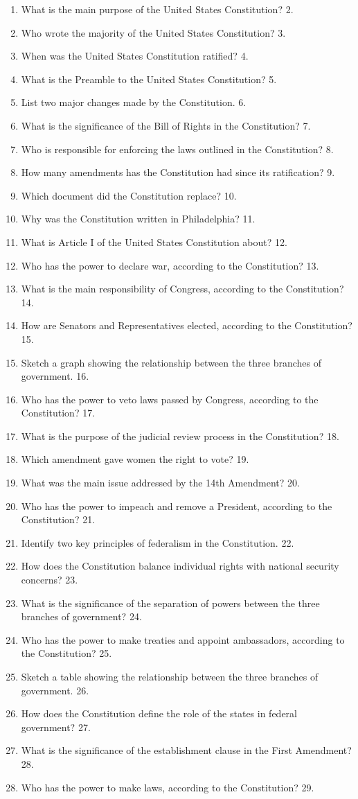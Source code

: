 \documentclass{article}
\begin{document}
\begin{enumerate}
\item What is the main purpose of the United States Constitution? 2. \item Who wrote the majority of the United States Constitution? 3. \item When was the United States Constitution ratified? 4. \item What is the Preamble to the United States Constitution? 5. \item List two major changes made by the Constitution. 6. \item What is the significance of the Bill of Rights in the Constitution? 7. \item Who is responsible for enforcing the laws outlined in the Constitution? 8. \item How many amendments has the Constitution had since its ratification? 9. \item Which document did the Constitution replace? 10. \item Why was the Constitution written in Philadelphia? 11. \item What is Article I of the United States Constitution about? 12. \item Who has the power to declare war, according to the Constitution? 13. \item What is the main responsibility of Congress, according to the Constitution? 14. \item How are Senators and Representatives elected, according to the Constitution? 15. \item Sketch a graph showing the relationship between the three branches of government. 16. \item Who has the power to veto laws passed by Congress, according to the Constitution? 17. \item What is the purpose of the judicial review process in the Constitution? 18. \item Which amendment gave women the right to vote? 19. \item What was the main issue addressed by the 14th Amendment? 20. \item Who has the power to impeach and remove a President, according to the Constitution? 21. \item Identify two key principles of federalism in the Constitution. 22. \item How does the Constitution balance individual rights with national security concerns? 23. \item What is the significance of the separation of powers between the three branches of government? 24. \item Who has the power to make treaties and appoint ambassadors, according to the Constitution? 25. \item Sketch a table showing the relationship between the three branches of government. 26. \item How does the Constitution define the role of the states in federal government? 27. \item What is the significance of the establishment clause in the First Amendment? 28. \item Who has the power to make laws, according to the Constitution? 29. 
\end{enumerate}
\end{document}
